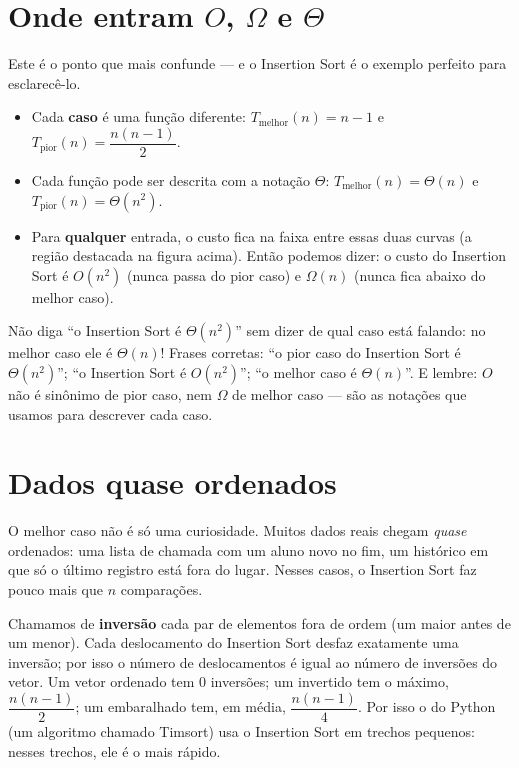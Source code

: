 \section{Onde entram \texorpdfstring{$O$, $\Omega$ e $\Theta$}{O, Ω e Θ}}

Este é o ponto que mais confunde — e o Insertion Sort é o exemplo perfeito para esclarecê-lo.

\begin{itemize}
  \item Cada \textbf{caso} é uma função diferente: $T_{\text{melhor}}(n) = n - 1$ e
        $T_{\text{pior}}(n) = \dfrac{n(n-1)}{2}$.
  \item Cada função pode ser descrita com a notação $\Theta$:
        $T_{\text{melhor}}(n) = \Theta(n)$ e $T_{\text{pior}}(n) = \Theta(n^2)$.
  \item Para \textbf{qualquer} entrada, o custo fica na faixa entre essas duas curvas (a região
        destacada na figura acima). Então podemos dizer: o custo do Insertion Sort é
        $O(n^2)$ (nunca passa do pior caso) e $\Omega(n)$ (nunca fica abaixo do melhor caso).
\end{itemize}

\begin{atencao}
Não diga \enquote{o Insertion Sort é $\Theta(n^2)$} sem dizer de qual caso está falando: no melhor
caso ele é $\Theta(n)$! Frases corretas: \enquote{o pior caso do Insertion Sort é $\Theta(n^2)$};
\enquote{o Insertion Sort é $O(n^2)$}; \enquote{o melhor caso é $\Theta(n)$}. E lembre: $O$ não é
sinônimo de pior caso, nem $\Omega$ de melhor caso — são as notações que usamos para descrever
cada caso.
\end{atencao}

\section{Dados quase ordenados}

O melhor caso não é só uma curiosidade. Muitos dados reais chegam \emph{quase} ordenados: uma
lista de chamada com um aluno novo no fim, um histórico em que só o último registro está fora do
lugar. Nesses casos, o Insertion Sort faz pouco mais que $n$ comparações.

\begin{aprofunde}
Chamamos de \textbf{inversão} cada par de elementos fora de ordem (um maior antes de um menor).
Cada deslocamento do Insertion Sort desfaz exatamente uma inversão; por isso o número de
deslocamentos é igual ao número de inversões do vetor. Um vetor ordenado tem 0 inversões; um
invertido tem o máximo, $\dfrac{n(n-1)}{2}$; um embaralhado tem, em média, $\dfrac{n(n-1)}{4}$.
Por isso o  do Python (um algoritmo chamado Timsort) usa o Insertion Sort em
trechos pequenos: nesses trechos, ele é o mais rápido.
\end{aprofunde}

